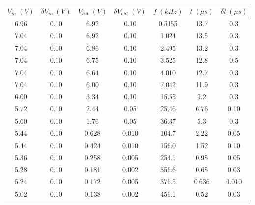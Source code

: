 \begin{tabular}{cc|cc|ccc}
\toprule
$V_{in} \; (V)$ & $\delta V_{in} \; (V)$ & $V_{out} \; (V)$ & $\delta V_{out} \; (V)$ & $f \; (kHz)$ & $t \; (\mu s)$ & $\delta t \; (\mu s)$ \\
\midrule
           6.96 &                   0.10 &             6.92 &                    0.10 &       0.5155 &           13.7 &                   0.3 \\
           7.04 &                   0.10 &             6.92 &                    0.10 &        1.024 &           13.5 &                   0.3 \\
           7.04 &                   0.10 &             6.86 &                    0.10 &        2.495 &           13.2 &                   0.3 \\
           7.04 &                   0.10 &             6.75 &                    0.10 &        3.525 &           12.8 &                   0.5 \\
           7.04 &                   0.10 &             6.64 &                    0.10 &        4.010 &           12.7 &                   0.3 \\
           7.04 &                   0.10 &             6.00 &                    0.10 &        7.042 &           11.9 &                   0.3 \\
           6.00 &                   0.10 &             3.34 &                    0.10 &        15.55 &            9.2 &                   0.3 \\
           5.72 &                   0.10 &             2.44 &                    0.05 &        25.46 &           6.76 &                  0.10 \\
           5.60 &                   0.10 &             1.76 &                    0.05 &        36.37 &            5.3 &                   0.3 \\
           5.44 &                   0.10 &            0.628 &                   0.010 &        104.7 &           2.22 &                  0.05 \\
           5.44 &                   0.10 &            0.424 &                   0.010 &        156.0 &           1.52 &                  0.10 \\
           5.36 &                   0.10 &            0.258 &                   0.005 &        254.1 &           0.95 &                  0.05 \\
           5.28 &                   0.10 &            0.181 &                   0.002 &        356.6 &           0.65 &                  0.03 \\
           5.24 &                   0.10 &            0.172 &                   0.005 &        376.5 &          0.636 &                 0.010 \\
           5.02 &                   0.10 &            0.138 &                   0.002 &        459.1 &           0.52 &                  0.03 \\
\bottomrule
\end{tabular}
